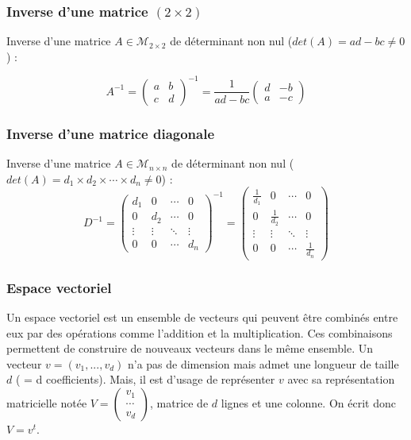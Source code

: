 \documentclass[
  letterpaper,
  DIV=11,
  numbers=noendperiod]{scrartcl}
\begin{document}
\subsubsection{\texorpdfstring{Inverse d'une matrice
\((2 \times 2)\)}{Inverse d'une matrice (2 \textbackslash times 2)}}\label{inverse-dune-matrice-2-times-2}

Inverse d'une matrice \(A\in \mathcal{M}_{2 \times 2}\) de déterminant
non nul (\(det(A) = ad -bc \ne 0\)) :

\[A^{-1} = \left(\begin{array}{cc} a & b \\ c & d \end{array} \right)^{-1}
= \frac{1}{ad-bc}\left(\begin{array}{cc} d & -b \\ a & -c \end{array} \right)
\]

\subsubsection{Inverse d'une matrice
diagonale}\label{inverse-dune-matrice-diagonale}

Inverse d'une matrice \(A\in \mathcal{M}_{n \times n}\) de déterminant
non nul (\(det(A) = d_1 \times d_2 \times \cdots \times d_n \ne 0\)) :
\[D^{-1} = 
\left(\begin{array}{cccc}
d_1 & 0 & \cdots & 0 \\
0 & d_2 & \cdots & 0 \\
\vdots & \vdots & \ddots & \vdots \\
0 & 0 & \cdots & d_n
\end{array}  \right)^{-1}
= \left(\begin{array}{cccc}
\frac{1}{d_1} & 0 & \cdots & 0 \\
0 & \frac{1}{d_2} & \cdots & 0 \\
\vdots & \vdots & \ddots & \vdots \\
0 & 0 & \cdots & \frac{1}{d_n}
\end{array} \right)\]

\subsubsection{Espace vectoriel}\label{espace-vectoriel}

Un espace vectoriel est un ensemble de vecteurs qui peuvent être
combinés entre eux par des opérations comme l'addition et la
multiplication. Ces combinaisons permettent de construire de nouveaux
vecteurs dans le même ensemble. Un vecteur \(v = (v_1,...,v_d)\) n'a pas
de dimension mais admet une longueur de taille \(d\) ( = d
coefficients). Mais, il est d'usage de représenter \(v\) avec sa
représentation matricielle notée \(V = \left(\begin{array}{c} v_1 \\
\cdots \\
v_d
\end{array}
\right)\), matrice de \(d\) lignes et une colonne. On écrit donc
\(V = v^t\).
\end{document}
